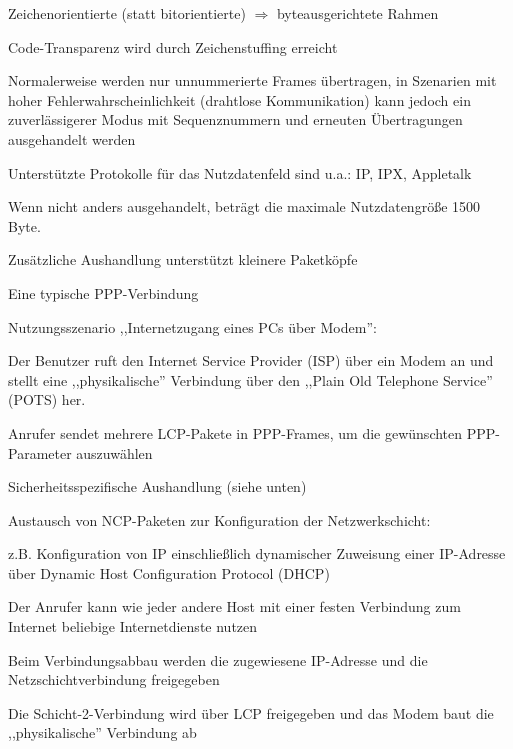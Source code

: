 \documentclass[a4paper]{article}
\begin{document}
\begin{multicols}{3}
      \begin{itemize*}
            \item Zeichenorientierte (statt bitorientierte)
            $\Rightarrow$ byteausgerichtete Rahmen
            \item Code-Transparenz wird durch Zeichenstuffing erreicht
            \item Normalerweise werden nur unnummerierte Frames übertragen, in Szenarien
            mit hoher Fehlerwahrscheinlichkeit (drahtlose Kommunikation) kann
            jedoch ein zuverlässigerer Modus mit Sequenznummern und erneuten
            Übertragungen ausgehandelt werden
            \item Unterstützte Protokolle für das Nutzdatenfeld sind u.a.: IP, IPX,
            Appletalk
            \item Wenn nicht anders ausgehandelt, beträgt die maximale Nutzdatengröße
            1500 Byte.
            \item Zusätzliche Aushandlung unterstützt kleinere Paketköpfe
      \end{itemize*}

      Eine typische PPP-Verbindung

      \begin{itemize*}
            \item Nutzungsszenario ,,Internetzugang eines PCs über Modem'':
            \begin{itemize*}
                  \item Der Benutzer ruft den Internet Service Provider (ISP) über ein Modem an und stellt eine ,,physikalische'' Verbindung über den ,,Plain Old Telephone Service'' (POTS) her.
                  \item Anrufer sendet mehrere LCP-Pakete in PPP-Frames, um die gewünschten PPP-Parameter auszuwählen
                  \item Sicherheitsspezifische Aushandlung (siehe unten)
                  \item Austausch von NCP-Paketen zur Konfiguration der Netzwerkschicht:
                  \begin{itemize*} \item z.B. Konfiguration von IP einschließlich dynamischer Zuweisung einer IP-Adresse über Dynamic Host Configuration Protocol (DHCP) \end{itemize*}
                  \item Der Anrufer kann wie jeder andere Host mit einer festen Verbindung zum Internet beliebige Internetdienste nutzen
                  \item Beim Verbindungsabbau werden die zugewiesene IP-Adresse und die Netzschichtverbindung freigegeben
                  \item Die Schicht-2-Verbindung wird über LCP freigegeben und das Modem baut die ,,physikalische'' Verbindung ab
            \end{itemize*}
      \end{itemize*}


\end{multicols}
\end{document}
